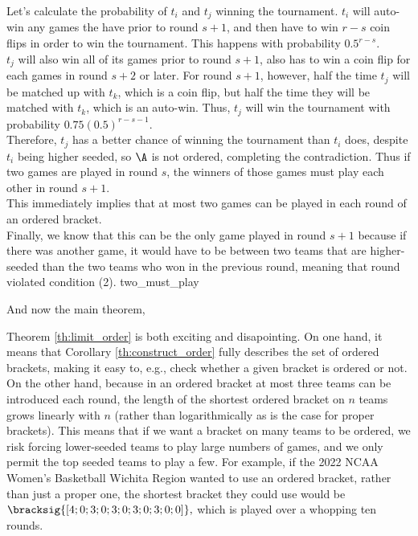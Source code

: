{{    Let's calculate the probability of $t_i$ and $t_j$ winning the tournament. $t_i$ will auto-win any games the have prior to round $s+1$, and then have to win $r - s$ coin flips in order to win the tournament. This happens with probability $0.5^{r-s}.$\\

    $t_j$ will also win all of its games prior to round $s+1$, also has to win a coin flip for each games in round $s+2$ or later. For round $s+1$, however, half the time $t_j$ will be matched up with $t_k$, which is a coin flip, but half the time they will be matched with $t_k$, which is an auto-win. Thus, $t_j$ will win the tournament with probability $0.75(0.5)^{r-s-1}.$\\

    Therefore, $t_j$ has a better chance of winning the tournament than $t_i$ does, despite $t_i$ being higher seeded, so $\A$ is not ordered, completing the contradiction. Thus if two games are played in round $s$, the winners of those games must play each other in round $s+1.$\\

    This immediately implies that at most two games can be played in each round of an ordered bracket.\\
    
    Finally, we know that this can be the only game played in round $s+1$ because if there was another game, it would have to be between two teams that are higher-seeded than the two teams who won in the previous round, meaning that round violated condition (2).
}{two_must_play}

And now the main theorem,


Theorem \ref{th:limit_order} is both exciting and disapointing. On one hand, it means that Corollary \ref{th:construct_order} fully describes the set of ordered brackets, making it easy to, e.g., check whether a given bracket is ordered or not. On the other hand, because in an ordered bracket at most three teams can be introduced each round, the length of the shortest ordered bracket on $n$ teams grows linearly with $n$ (rather than logarithmically as is the case for proper brackets). This means that if we want a bracket on many teams to be ordered, we risk forcing lower-seeded teams to play large numbers of games, and we only permit the top seeded teams to play a few. For example, if the 2022 NCAA Women's Basketball Wichita Region wanted to use an ordered bracket, rather than just a proper one, the shortest bracket they could use would be $\bracksig{[4; 0; 3; 0; 3; 0; 3; 0; 3; 0; 0]},$ which is played over a whopping ten rounds.

}
